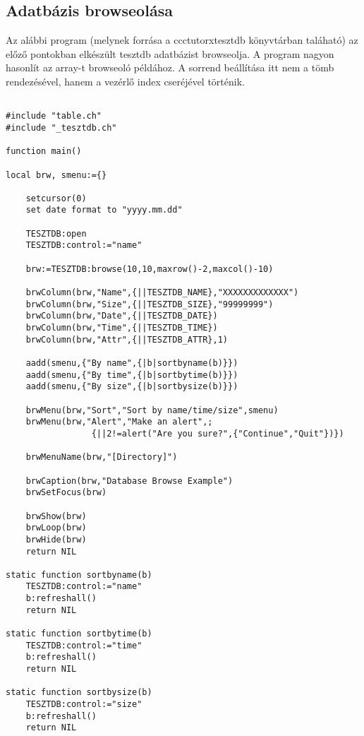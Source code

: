 \subsection{Adatbázis browseolása}

Az alábbi program (melynek forrása a ccctutor\bslash xtesztdb könyvtárban
taláható) az előző pontokban elkészült tesztdb adatbázist browseolja.
A program nagyon hasonlít az array-t browseoló példához. A sorrend 
beállítása itt nem a tömb rendezésével, hanem a vezérlő index cseréjével
történik. 

\begin{verbatim}

#include "table.ch"
#include "_tesztdb.ch"

function main()

local brw, smenu:={}

    setcursor(0)
    set date format to "yyyy.mm.dd"
    
    TESZTDB:open
    TESZTDB:control:="name"
    
    brw:=TESZTDB:browse(10,10,maxrow()-2,maxcol()-10)

    brwColumn(brw,"Name",{||TESZTDB_NAME},"XXXXXXXXXXXXX")
    brwColumn(brw,"Size",{||TESZTDB_SIZE},"99999999")
    brwColumn(brw,"Date",{||TESZTDB_DATE})
    brwColumn(brw,"Time",{||TESZTDB_TIME})
    brwColumn(brw,"Attr",{||TESZTDB_ATTR},1)

    aadd(smenu,{"By name",{|b|sortbyname(b)}})
    aadd(smenu,{"By time",{|b|sortbytime(b)}})
    aadd(smenu,{"By size",{|b|sortbysize(b)}})
    
    brwMenu(brw,"Sort","Sort by name/time/size",smenu)
    brwMenu(brw,"Alert","Make an alert",;
                 {||2!=alert("Are you sure?",{"Continue","Quit"})})
    
    brwMenuName(brw,"[Directory]")
    
    brwCaption(brw,"Database Browse Example")
    brwSetFocus(brw)

    brwShow(brw)
    brwLoop(brw)
    brwHide(brw)
    return NIL

static function sortbyname(b)    
    TESZTDB:control:="name"
    b:refreshall()
    return NIL
    
static function sortbytime(b)    
    TESZTDB:control:="time"
    b:refreshall()
    return NIL

static function sortbysize(b)    
    TESZTDB:control:="size"
    b:refreshall()
    return NIL
\end{verbatim}

